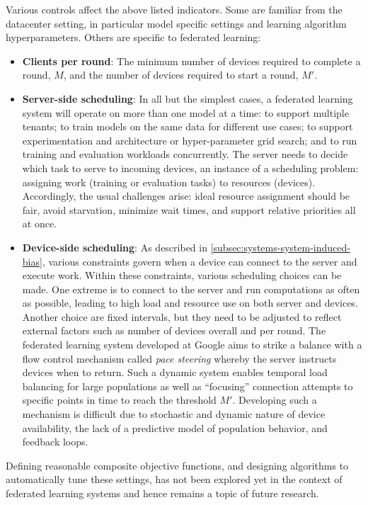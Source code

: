 \documentclass[11pt]{article}
\begin{document}
Various controls affect the above listed indicators. Some are familiar from the datacenter setting, in particular model specific settings and learning algorithm hyperparameters. Others are specific to federated learning:
\begin{itemize}
    \item \textbf{Clients per round}: The minimum number of devices required to complete a round, $M$, and the number of devices required to start a round, $M'$.
    \item \textbf{Server-side scheduling}: In all but the simplest cases, a federated learning system will operate on more than one model at a time: to support multiple tenants; to train models on the same data for different use cases; to support experimentation and architecture or hyper-parameter grid search; and to run training and evaluation workloads concurrently. The server needs to decide which task to serve to incoming devices, an instance of a scheduling problem: assigning work (training or evaluation tasks) to resources (devices). Accordingly, the usual challenges arise: ideal resource assignment should be fair, avoid starvation, minimize wait times, and support relative priorities all at once.
    \item \textbf{Device-side scheduling}: As described in \cref{subsec:systems-system-induced-bias}, various constraints govern when a device can connect to the server and execute work. Within these constraints, various scheduling choices can be made. One extreme is to connect to the server and run computations as often as possible, leading to high load and resource use on both server and devices. Another choice are fixed intervals, but they need to be adjusted to reflect external factors such as number of devices overall and per round. The federated learning system developed at Google aims to strike a balance with a flow control mechanism called \textit{pace steering} \citep{bonawitz19sysml} whereby the server instructs devices when to return. Such a dynamic system enables temporal load balancing for large populations as well as “focusing” connection attempts to specific points in time to reach the threshold $M'$. Developing such a mechanism is difficult due to stochastic and dynamic nature of device availability, the lack of a predictive model of population behavior, and feedback loops.
\end{itemize}

Defining reasonable composite objective functions, and designing algorithms to automatically tune these settings, has not been explored yet in the context of federated learning systems and hence remains a topic of future research.
\end{document}
